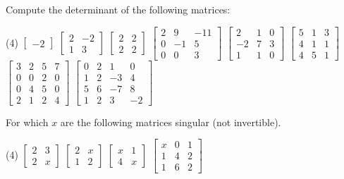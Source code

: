 \begin{exercise}\ansMark%
\pagebreak[2]
Compute the determinant of the following matrices:
\begin{tasks}(4)
\task
$\begin{bmatrix}
-2
\end{bmatrix}$
\task
$\begin{bmatrix}
2 & -2 \\
1 & 3
\end{bmatrix}$
\task
$\begin{bmatrix}
2 & 2 \\
2 & 2
\end{bmatrix}$
\task
$\begin{bmatrix}
2 & 9 & -11 \\
0 & -1 & 5 \\
0 & 0 & 3
\end{bmatrix}$
\task
$\begin{bmatrix}
2 & 1 & 0 \\
-2 & 7 & 3 \\
1 & 1 & 0
\end{bmatrix}$
\task
$\begin{bmatrix}
5 & 1 & 3 \\
4 & 1 & 1 \\
4 & 5 & 1
\end{bmatrix}$
\task
$\begin{bmatrix}
3 & 2 & 5 & 7 \\
0 & 0 & 2 & 0 \\
0 & 4 & 5 & 0 \\
2 & 1 & 2 & 4
\end{bmatrix}$
\task
$\begin{bmatrix}
 0 &  2 &  1 &  0 \\
 1 &  2 & -3 &  4 \\
 5 &  6 & -7 &  8 \\
 1 &  2 &  3 & -2
\end{bmatrix}$
\end{tasks}
\end{exercise}

\begin{exercise}
For which $x$ are the following matrices singular (not invertible).
\begin{tasks}(4)
\task
$\begin{bmatrix}
2 & 3 \\
2 & x
\end{bmatrix}$
\task
$\begin{bmatrix}
2 & x \\
1 & 2
\end{bmatrix}$
\task
$\begin{bmatrix}
x & 1 \\
4 & x
\end{bmatrix}$
\task
$\begin{bmatrix}
x & 0 & 1 \\
1 & 4 & 2 \\
1 & 6 & 2
\end{bmatrix}$
\end{tasks}
\end{exercise}

